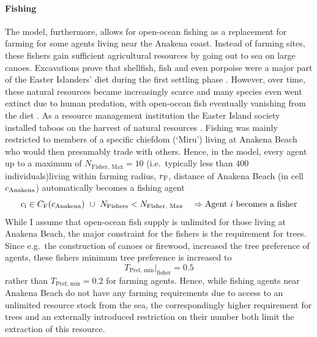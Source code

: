 \paragraph{Fishing}
The model, furthermore, allows for open-ocean fishing as a replacement for farming for some agents living near the Anakena coast.
Instead of farming sites, these fishers gain sufficient agricultural resources by going out to sea on large canoes.
Excavations prove that shellfish, fish and even porpoise were a major part of the Easter Islanders' diet during the first settling phase \citep{Bahn2017}.
However, over time, these natural resources became increasingly scarce and many species even went extinct due to human predation, with open-ocean fish eventually vanishing from the diet \citep{Diamond2011}.
As a resource management institution the Easter Island society installed taboos on the harvest of natural resources \citep{Good2006}. 
Fishing was mainly restricted to members of a specific chiefdom (`Miru') living at Anakena Beach \citep{Bahn2017} who would then presumably trade with others.
Hence, in the model, every agent up to a maximum of $N_\text{Fisher, Max} = 10$ (i.e.\ typically less than $400$ individuals)living within farming radius, $r_{\rm F}$, distance of Anakena Beach (in cell $c_{\rm Anakena}$) automatically becomes a fishing agent
\begin{equation}
 	c_{\rm i} \in C_{\rm F}(c_{\rm Anakena}) \  \cup \ N_\text{Fishers}<N_\text{Fisher, Max} \quad \Rightarrow \text{Agent }i\text{ becomes a fisher}
\end{equation}
While I assume that open-ocean fish supply is unlimited for those living at Anakena Beach, the major constraint for the fishers is the requirement for trees.
Since e.g.\ the construction of canoes or firewood, increased the tree preference of agents, these fishers minimum tree preference is increased to
\begin{equation}
T_\text{Pref, min}|_\text{fisher} = 0.5
\end{equation} 
rather than $T_\text{Pref, min} = 0.2$ for farming agents.
Hence, while fishing agents near Anakena Beach do not have any farming requirements due to access to an unlimited resource stock from the sea, the correspondingly higher requirement for trees and an externally introduced restriction on their number both limit the extraction of this resource.

